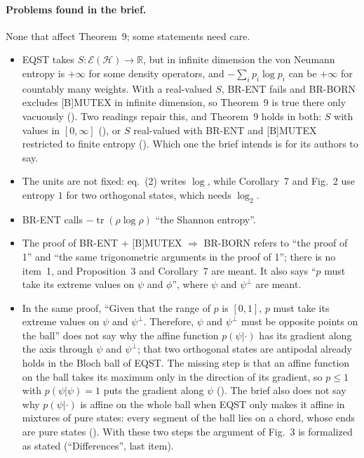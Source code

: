 \documentclass[11pt]{article}
\begin{document}
\paragraph{Problems found in the brief.} None that affect Theorem~9; some statements need care.
\begin{itemize}
\item EQST takes $S : \mathcal E(\mathcal H) \to \mathbb R$, but in infinite dimension the von
  Neumann entropy is $+\infty$ for some density operators, and $-\sum_i p_i\log p_i$ can be
  $+\infty$ for countably many weights. With a real-valued $S$, BR-ENT fails and BR-BORN excludes
  [B]MUTEX in infinite dimension, so Theorem~9 is true there only vacuously
  (). Two readings repair this, and Theorem~9 holds in both:
  $S$ with values in $[0, \infty]$ (), or $S$ real-valued with
  BR-ENT and [B]MUTEX restricted to finite entropy ().
  Which one the brief intends is for its authors to say.
\item The units are not fixed: eq.~(2) writes $\log$, while Corollary~7 and Fig.~2 use entropy
  $1$ for two orthogonal states, which needs $\log_2$.
\item BR-ENT calls $-\operatorname{tr}(\rho\log\rho)$ ``the Shannon entropy''.
\item The proof of BR-ENT + [B]MUTEX $\Rightarrow$ BR-BORN refers to ``the proof of 1'' and
  ``the same trigonometric arguments in the proof of 1''; there is no item~1, and
  Proposition~3 and Corollary~7 are meant. It also says ``$p$ must take its extreme values on
  $\psi$ and $\phi$'', where $\psi$ and $\psi^\perp$ are meant.
\item In the same proof, ``Given that the range of $p$ is $[0,1]$, $p$ must take its extreme
  values on $\psi$ and $\psi^\perp$. Therefore, $\psi$ and $\psi^\perp$ must be opposite points on
  the ball'' does not say why the affine function $p(\psi|\cdot)$ has its gradient along the axis
  through $\psi$ and $\psi^\perp$; that two orthogonal states are antipodal already holds in
  the Bloch ball of EQST. The missing step is that an affine function on the ball takes its
  maximum only in the direction of its gradient, so $p \le 1$ with $p(\psi|\psi) = 1$ puts the
  gradient along $\psi$ (). The brief also does not say why
  $p(\psi|\cdot)$ is affine on the whole ball when EQST only makes it affine in mixtures of pure
  states: every segment of the ball lies on a chord, whose ends are pure states
  (). With these two steps the argument of Fig.~3 is
  formalized as stated (``Differences'', last item).
\end{itemize}
\end{document}

